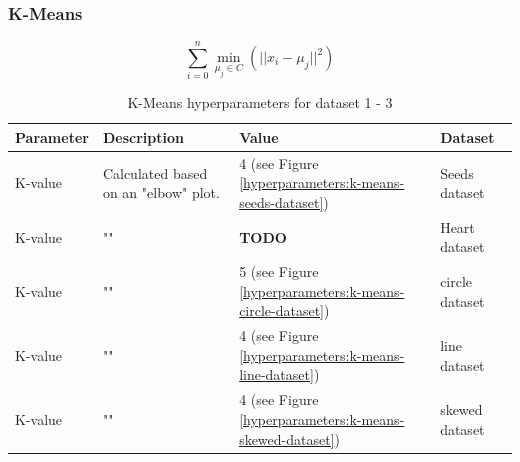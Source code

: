 \subsubsection{K-Means}
\begin{equation}
  \sum_{i=0}^{n}\min_{\mu_j \in C}(||x_i - \mu_j||^2)
\end{equation}
\begin{table}[h]
  \begin{tabular}{|l|p{6cm}|l|l|}
    \hline
    Parameter & Description                          & Value                                                       & Dataset        \\ \hline
    K-value   & Calculated based on an "elbow" plot. & 4 (see Figure \ref{hyperparameters:k-means-seeds-dataset})  & Seeds dataset  \\ \hline
    K-value   & ""                                   & \textbf{TODO}                                               & Heart dataset  \\ \hline
    K-value   & ""                                   & 5 (see Figure \ref{hyperparameters:k-means-circle-dataset}) & circle dataset \\ \hline
    K-value   & ""                                   & 4 (see Figure \ref{hyperparameters:k-means-line-dataset})   & line dataset   \\ \hline
    K-value   & ""                                   & 4 (see Figure \ref{hyperparameters:k-means-skewed-dataset}) & skewed dataset \\ \hline
  \end{tabular}
  \caption{K-Means hyperparameters for dataset 1 - 3}
  \label{tab:kmeans-formula-dataset-2}
\end{table}


